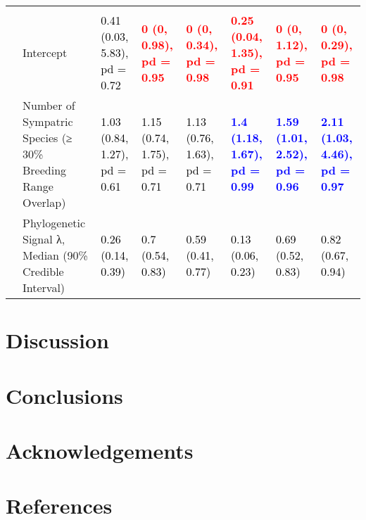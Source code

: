 \documentclass[
  a4paper,
]{article}
\begin{document}
\begin{landscape}
\begin{table}
{\begin{tabular}[t]{llllllll}
\addlinespace[0.3em]
\multicolumn{1}{l}{\textbf{Breeding Sympatry}}\\
\hspace{1em} & Intercept & \textcolor{black}{0.41 (0.03, 5.83), pd = 0.72} & \textcolor{red}{\textbf{0 (0, 0.98), pd = 0.95}} & \textcolor{red}{\textbf{0 (0, 0.34), pd = 0.98}} & \textcolor{red}{\textbf{0.25 (0.04, 1.35), pd = 0.91}} & \textcolor{red}{\textbf{0 (0, 1.12), pd = 0.95}} & \textcolor{red}{\textbf{0 (0, 0.29), pd = 0.98}}\\
 & Number of Sympatric Species 
\hspace{1em} (≥ 30\% Breeding Range Overlap) & \textcolor{black}{1.03 (0.84, 1.27), pd = 0.61} & \textcolor{black}{1.15 (0.74, 1.75), pd = 0.71} & \textcolor{black}{1.13 (0.76, 1.63), pd = 0.71} & \textcolor{blue}{\textbf{1.4 (1.18, 1.67), pd = 0.99}} & \textcolor{blue}{\textbf{1.59 (1.01, 2.52), pd = 0.96}} & \textcolor{blue}{\textbf{2.11 (1.03, 4.46), pd = 0.97}}\\
\hspace{1em} & Phylogenetic Signal λ, Median (90\% Credible Interval) & \textcolor{black}{0.26 (0.14, 0.39)} & \textcolor{black}{0.7 (0.54, 0.83)} & \textcolor{black}{0.59 (0.41, 0.77)} & \textcolor{black}{0.13 (0.06, 0.23)} & \textcolor{black}{0.69 (0.52, 0.83)} & \textcolor{black}{0.82 (0.67, 0.94)}\\
\bottomrule
\end{tabular}}
\end{table}
\end{landscape}

\hypertarget{discussion}{%
\section{Discussion}\label{discussion}}

\hypertarget{conclusions}{%
\section{Conclusions}\label{conclusions}}

\hypertarget{acknowledgements}{%
\section{Acknowledgements}\label{acknowledgements}}

\hypertarget{references}{%
\section*{References}\label{references}}
\end{document}
